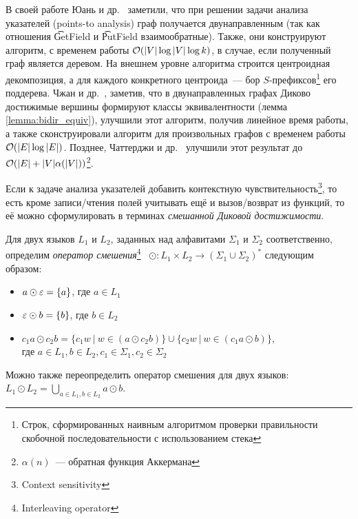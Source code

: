В своей работе Юань и др.~\cite{Yuan09} заметили, что при решении задачи анализа указателей (points-to analysis) граф получается двунаправленным (так как отношения \t{GetField} и \t{PutField} взаимообратные). Также, они конструируют алгоритм, с временем работы $\mathcal{O}(|V| \log |V| \log k)$, в случае, если полученный граф является деревом. На внешнем уровне алгоритма строится центроидная декомпозиция, а для каждого конкретного центроида~--- бор $S$-префиксов\footnote{Строк, сформированных наивным алгоритмом проверки правильности скобочной последовательности с использованием стека} его поддерева. Чжан и др.~\cite{Zhang13}, заметив, что в двунаправленных графах Диково достижимые вершины формируют классы эквивалентности (лемма \ref{lemma:bidir_equiv}), улучшили этот алгоритм, получив линейное время работы, а также сконструировали алгоритм для произвольных графов с временем работы $\mathcal{O}(|E| \log |E|)$. Позднее, Чаттерджи и др.~\cite{Chatterjee17} улучшили этот результат до $\mathcal{O}(|E| + |V| \alpha(|V|))$\footnote{$\alpha(n)$~--- обратная функция Аккермана}.

Если к задаче анализа указателей добавить контекстную чувствительность\footnote{Context sensitivity}, то есть кроме записи/чтения полей учитывать ещё и вызов/возврат из функций, то её можно сформулировать в терминах \textit{смешанной Диковой достижимости}.

\pagebreak

\begin{definition}
  Для двух языков $L_1$ и $L_2$, заданных над алфавитами $\Sigma_1$ и $\Sigma_2$ соответственно, определим \textit{оператор смешения}\footnote{Interleaving operator}~\cite{Li21} $\odot: L_1 \times L_2 \to (\Sigma_1 \cup \Sigma_2)^{*}$ следующим образом:
  \vspace{-\topsep}
  \begin{itemize}
    \setlength\itemsep{-0.1em}
    \item $a \odot \varepsilon = \{ a \}$, где $a \in L_1$
    \item $\varepsilon \odot b = \{ b \}$, где $b \in L_2$
    \item $c_1 a \odot c_2 b = \{ c_1 w~|~w \in (a \odot c_2 b) \} \cup \{ c_2 w~|~w \in (c_1 a \odot b) \}$,\\ где $a \in L_1, b \in L_2, c_1 \in \Sigma_1, c_2 \in \Sigma_2$
  \end{itemize}

  Можно также переопределить оператор смешения для двух языков:\\ $L_1 \odot L_2 = \bigcup\limits_{a \in L_1, b \in L_2} a \odot b$.
\end{definition}

